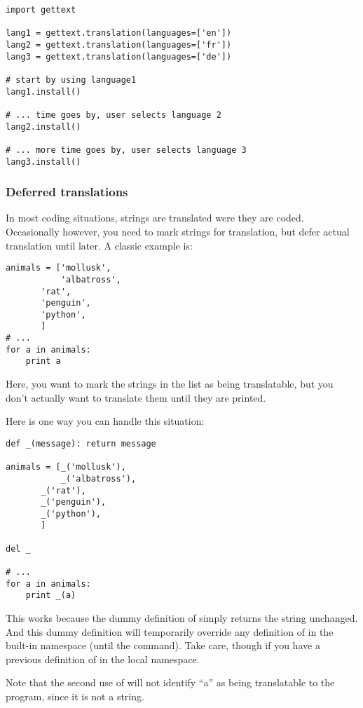 \begin{verbatim}
import gettext

lang1 = gettext.translation(languages=['en'])
lang2 = gettext.translation(languages=['fr'])
lang3 = gettext.translation(languages=['de'])

# start by using language1
lang1.install()

# ... time goes by, user selects language 2
lang2.install()

# ... more time goes by, user selects language 3
lang3.install()
\end{verbatim}

\subsubsection{Deferred translations}

In most coding situations, strings are translated were they are coded.
Occasionally however, you need to mark strings for translation, but
defer actual translation until later.  A classic example is:

\begin{verbatim}
animals = ['mollusk',
           'albatross',
	   'rat',
	   'penguin',
	   'python',
	   ]
# ...
for a in animals:
    print a
\end{verbatim}

Here, you want to mark the strings in the  list as being
translatable, but you don't actually want to translate them until they
are printed.

Here is one way you can handle this situation:

\begin{verbatim}
def _(message): return message

animals = [_('mollusk'),
           _('albatross'),
	   _('rat'),
	   _('penguin'),
	   _('python'),
	   ]

del _

# ...
for a in animals:
    print _(a)
\end{verbatim}

This works because the dummy definition of \function{_()} simply returns
the string unchanged.  And this dummy definition will temporarily
override any definition of \function{_()} in the built-in namespace
(until the  command).
Take care, though if you have a previous definition of \function{_} in
the local namespace.

Note that the second use of \function{_()} will not identify ``a'' as
being translatable to the  program, since it is not
a string.

